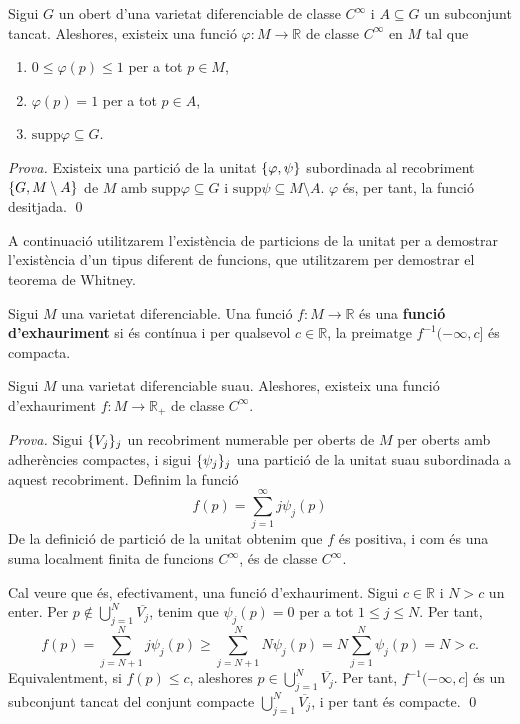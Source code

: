 \begin{corol}
    Sigui $G$ un obert d'una varietat diferenciable de classe $C^\infty$ i $A\subseteq G$ un subconjunt tancat. Aleshores, existeix una funció $\varphi:M\to\mathbb R$ de classe $C^\infty$ en $M$ tal que
    \begin{enumerate}
        \item $0\leq\varphi(p)\leq 1$ per a tot $p\in M$,
        \item $\varphi(p) = 1$ per a tot $p\in A$,
        \item $\text{supp}\varphi\subseteq G$.
    \end{enumerate}
\end{corol}
{
\color{green!50!black} \textit{Prova.} 
Existeix una partició de la unitat $\{\varphi, \psi\}$ subordinada al recobriment $\{G, M\setminus A\}$ de $M$ amb $\text{supp}\varphi\subseteq G$ i $\text{supp}\psi\subseteq M\setminus A$. $\varphi$ és, per tant, la funció desitjada. \qed
}

A continuació utilitzarem l'existència de particions de la unitat per a demostrar l'existència d'un tipus diferent de funcions, que utilitzarem per demostrar el teorema de Whitney.

\begin{defi}
    Sigui $M$ una varietat diferenciable. Una funció $f:M\to\mathbb R$ és una \textbf{funció d'exhauriment} si és contínua i per qualsevol $c\in\mathbb R$, la preimatge $f^{-1}(-\infty,c]$ és compacta.
\end{defi}

\begin{prop}
    Sigui $M$ una varietat diferenciable suau. Aleshores, existeix una funció d'exhauriment $f:M\to\mathbb R_+$ de classe $C^\infty$.
\end{prop}
{
    \color{green!50!black} \textit{Prova.} 
    Sigui $\{V_j\}_j$ un recobriment numerable per oberts de $M$ per oberts amb adherències compactes, i sigui $\{\psi_j\}_j$ una partició de la unitat suau subordinada a aquest recobriment. Definim la funció
    \begin{equation*}
        f(p) = \sum_{j=1}^\infty j\psi_j(p)
    \end{equation*}
    De la definició de partició de la unitat obtenim que $f$ és positiva, i com és una suma localment finita de funcions $C^\infty$, és de classe $C^\infty$.

    Cal veure que és, efectivament, una funció d'exhauriment. Sigui $c\in\mathbb R$ i $N>c$ un enter. Per $p\not\in\bigcup_{j=1}^N \overline{V_j}$, tenim que $\psi_j(p)=0$ per a tot $1\le j\le N$. Per tant,
    \begin{equation*}
        f(p) = \sum_{j=N+1}^N j\psi_j(p) \ge \sum_{j=N+1}^N N\psi_j(p) =N\sum_{j=1}^N\psi_j(p) = N>c.
    \end{equation*}
    Equivalentment, si $f(p)\le c$, aleshores $p\in\bigcup_{j=1}^N \overline{V_j}$. Per tant, $f^{-1}(-\infty,c]$ és un subconjunt tancat del conjunt compacte $\bigcup_{j=1}^N \overline{V_j}$, i per tant és compacte.
    \qed
}



